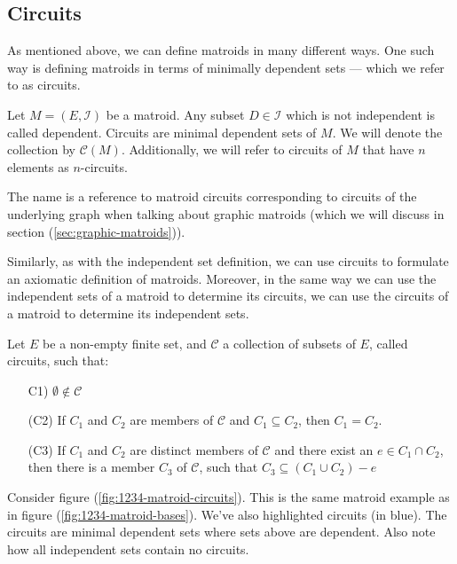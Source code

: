 \subsection{Circuits}\label{sec:circuits}
As mentioned above, we can define matroids in many different ways. One such way is defining matroids in terms of minimally dependent sets --- which we refer to as circuits.

\begin{defn}
Let $M = (E, \mathcal{I})$ be a matroid. Any subset $D \in \mathcal{I}$ which is not independent is called dependent. Circuits are minimal dependent sets of $M$. We will denote the collection by $\mathcal{C}(M)$. Additionally, we will refer to circuits of $M$ that have $n$ elements as $n$-circuits.
\end{defn}

The name is a reference to matroid circuits corresponding to circuits of the underlying graph when talking about graphic matroids (which we will discuss in section (\ref{sec:graphic-matroids})).

Similarly, as with the independent set definition, we can use circuits to formulate an axiomatic definition of matroids. Moreover, in the same way we can use the independent sets of a matroid to determine its circuits, we can use the circuits of a matroid to determine its independent sets.

\begin{defn}
    Let $E$ be a non-empty finite set, and $\mathcal{C}$ a collection of subsets of $E$, called circuits, such that:

    \begin{enumerate}
        \item[C1)] $\emptyset \notin \mathcal{C}$

        \item[(C2)] If $C_1$ and $C_2$ are members of $\mathcal{C}$ and $C_1 \subseteq C_2$, then $C_1 = C_2$.

        \item[(C3)] If $C_1$ and $C_2$ are distinct members of $\mathcal{C}$ and there exist an $e \in C_1 \cap C_2$, then there is a member $C_3$ of $\mathcal{C}$, such that $C_3 \subseteq (C_1  \cup C_2) - e$
    \end{enumerate}
    
\end{defn}

\begin{exmp}
  Consider figure (\ref{fig:1234-matroid-circuits}). This is the same matroid example as in figure (\ref{fig:1234-matroid-bases}). We've also highlighted circuits (in blue). The circuits are minimal dependent sets where sets above are dependent. Also note how all independent sets contain no circuits.
\end{exmp}

